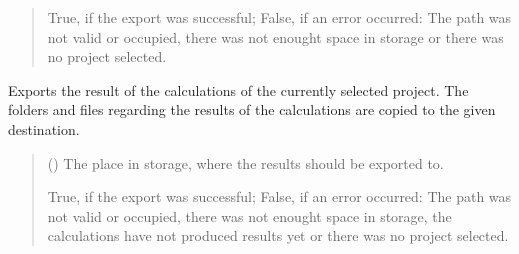 \documentclass[letterpaper,10pt,english]{sphinxmanual}
\begin{document}
\begin{fulllineitems}
\begin{fulllineitems}
\begin{quote}
\begin{description}
\sphinxAtStartPar
True, if the export was successful; False, if an error occurred: The path was not valid or occupied, there was not enought space in storage or there was no project selected.

\sphinxAtStartPar
{}

\end{description}\end{quote}

\end{fulllineitems}


\begin{fulllineitems}
\label{\detokenize{apidoc/src.osm_configurator.control:src.osm_configurator.control.export_controller.ExportController.export_calculations}}
\pysigstartsignatures
{}
\pysigstopsignatures
\sphinxAtStartPar
Exports the result of the calculations of the currently selected project.
The folders and files regarding the results of the calculations are copied to the given destination.
\begin{quote}\begin{description}
\sphinxAtStartPar
{} () \textendash{} The place in storage, where the results should be exported to.

\sphinxAtStartPar
True, if the export was successful; False, if an error occurred: The path was not valid or occupied, there was not enought space in storage, the calculations have not produced results yet or there was no project selected.

\sphinxAtStartPar
{}

\end{description}\end{quote}

\end{fulllineitems}



\end{fulllineitems}
\end{document}

